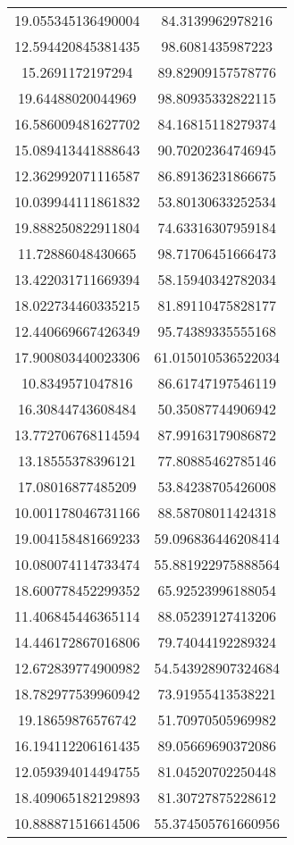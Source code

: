 \begin{table}
\begin{tabular}{cc}
19.055345136490004 & 84.3139962978216 \\
12.594420845381435 & 98.6081435987223 \\
15.2691172197294 & 89.82909157578776 \\
19.64488020044969 & 98.80935332822115 \\
16.586009481627702 & 84.16815118279374 \\
15.089413441888643 & 90.70202364746945 \\
12.362992071116587 & 86.89136231866675 \\
10.039944111861832 & 53.80130633252534 \\
19.888250822911804 & 74.63316307959184 \\
11.72886048430665 & 98.71706451666473 \\
13.422031711669394 & 58.15940342782034 \\
18.022734460335215 & 81.89110475828177 \\
12.440669667426349 & 95.74389335555168 \\
17.900803440023306 & 61.015010536522034 \\
10.8349571047816 & 86.61747197546119 \\
16.30844743608484 & 50.35087744906942 \\
13.772706768114594 & 87.99163179086872 \\
13.18555378396121 & 77.80885462785146 \\
17.08016877485209 & 53.84238705426008 \\
10.001178046731166 & 88.58708011424318 \\
19.004158481669233 & 59.096836446208414 \\
10.080074114733474 & 55.881922975888564 \\
18.600778452299352 & 65.92523996188054 \\
11.406845446365114 & 88.05239127413206 \\
14.446172867016806 & 79.74044192289324 \\
12.672839774900982 & 54.543928907324684 \\
18.782977539960942 & 73.91955413538221 \\
19.18659876576742 & 51.70970505969982 \\
16.194112206161435 & 89.05669690372086 \\
12.059394014494755 & 81.04520702250448 \\
18.409065182129893 & 81.30727875228612 \\
10.888871516614506 & 55.374505761660956 \\

\end{tabular}
\end{table}
